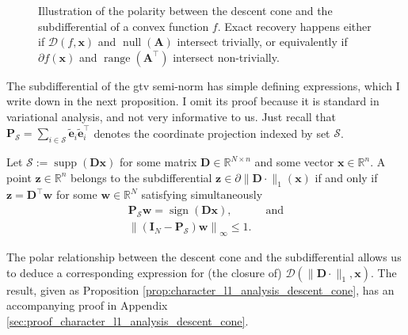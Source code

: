 \begin{figure}[H]
    \centering
    
    \caption[Polarity between descent cone and subdifferential]{Illustration of the polarity between the descent cone and the subdifferential of a convex function $f$. Exact recovery happens either if $\mathcal{D}(f, \mathbf{x})$ and $\operatorname{null} \left ( \mathbf{A} \right )$ intersect trivially, or equivalently if $\partial f(\mathbf{x})$ and $\operatorname{range} \left( \mathbf{A}^\top \right)$ intersect non-trivially.}
    \label{fig:illustration_descent_cone_subdifferential}
\end{figure}

The subdifferential of the \acrshort{gtv} semi-norm has simple defining expressions, which I write down in the next proposition. I omit its proof because it is standard in variational analysis, and not very informative to us. Just recall that $\mathbf{P}_{\mathcal{S}} = \sum_{i \in \mathcal{S}} \tilde{\mathbf{e}}_i \tilde{\mathbf{e}}_i^\top$ denotes the coordinate projection indexed by set $\mathcal{S}$.

\begin{proposition}\label{prop:character_subdifferential_l1}
    Let $\mathcal{S} := \operatorname{supp}\left ( \mathbf{Dx} \right )$ for some matrix $\mathbf{D} \in \mathbb{R}^{N \times n}$ and some vector $\mathbf{x} \in \mathbb{R}^{n}$. A point $\mathbf{z} \in \mathbb{R}^{n}$ belongs to the subdifferential $\mathbf{z} \in \partial \|\mathbf{D} \cdot \|_1 (\mathbf{x})$ if and only if $\mathbf{z} = \mathbf{D}^\top \mathbf{w}$ for some $\mathbf{w} \in \mathbb{R}^{N}$ satisfying simultaneously
    \begin{align}
        \mathbf{P}_{\mathcal{S}} \mathbf{w} = \operatorname{sign} \left ( \mathbf{Dx} \right ), & \enspace \text{and}\\
        \left \| \left ( \mathbf{I}_N - \mathbf{P}_\mathcal{S} \right ) \mathbf{w} \right \|_{\infty} \leq 1.
    \end{align}
\end{proposition}

The polar relationship between the descent cone and the subdifferential allows us to deduce a corresponding expression for (the closure of) $\mathcal{D}(\| \mathbf{D} \cdot \|_1, \mathbf{x})$. The result, given as Proposition \ref{prop:character_l1_analysis_descent_cone}, has an accompanying proof in Appendix \ref{sec:proof_character_l1_analysis_descent_cone}.

\clearpage

